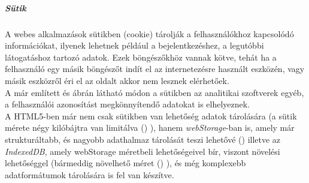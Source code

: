 \subparagraph{Sütik} %
\label{subp:sütik}
A webes alkalmazások sütikben (cookie) tárolják a felhasználókhoz kapcsolódó információkat, ilyenek lehetnek például a bejelentkezéshez, a legutóbbi látogatáshoz tartozó adatok. Ezek böngészőkhöz vannak kötve, tehát ha a felhasználó egy másik böngészőt indít el az internetezésre használt eszközén, vagy másik eszközről éri el az oldalt akkor nem lesznek elérhetőek.\hfill\\
A már említett és  ábrán látható módon a sütikben az analitikai szoftverek egyéb, a felhasználói azonosítást megkönnyítendő adatokat is elhelyeznek.\hfill\\
A HTML5-ben már nem csak sütikben van lehetőség adatok tárolására (a sütik mérete négy kilóbájtra van limitálva (\cite{msdn_cookie}) ), hanem \textit{webStorage}-ban is, amely már strukturáltabb, és nagyobb adathalmaz tárolását teszi lehetővé (\cite{webstorage}) illetve az \textit{IndexedDB}, amely webStorage méretbeli lehetőségeivel bír, viszont növelési lehetőséggel (bármeddig növelhető 
méret (\cite{mdn_indexeddb}) ), és még komplexebb adatformátumok tárolására is fel van készítve. 

